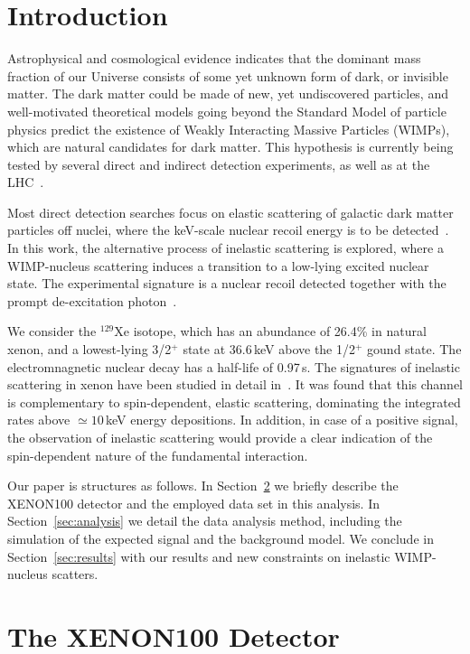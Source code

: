 \section{\label{sec:level1} Introduction}
Astrophysical and cosmological evidence indicates that the dominant mass fraction of our Universe consists of some yet unknown
form of dark, or invisible matter. The dark matter could be made of new, yet undiscovered particles, and well-motivated
theoretical models going beyond the Standard Model of particle physics predict the existence of Weakly Interacting Massive
Particles (WIMPs), which are natural candidates for dark matter. This hypothesis is currently being tested by several direct
and indirect detection experiments, as well as at the LHC~\cite{Bertone:2010zza,Baudis:2016qwx}.

Most direct detection searches focus on elastic scattering of galactic dark matter particles off nuclei, where the keV-scale 
nuclear recoil energy is to be detected~\cite{Baudis:2012ig,Baudis:2015mpa,Undagoitia:2015gya}. In this work, the 
alternative process of inelastic scattering is explored, where a WIMP-nucleus scattering induces a transition to a low-lying 
excited nuclear state. The experimental signature is a nuclear recoil detected together with the prompt de-excitation 
photon~\cite{Ellis:1988nb}. 

We consider the $^{129}\text{Xe}$ isotope, which has an abundance of 26.4\% in natural xenon, and a lowest-lying 
3/2$^{+}$ state at 36.6\,keV above the 1/2$^+$ gound state. The electromnagnetic nuclear decay has a half-life of 0.97\,s. 
The signatures of inelastic scattering in xenon have been studied in detail in~\cite{Baudis:2013bba}. It was found that this 
channel is complementary to spin-dependent, elastic scattering, dominating the integrated rates above $\simeq10$\,keV energy 
depositions. In addition, in case of a positive signal, the observation of inelastic scattering would provide a clear 
indication of the spin-dependent nature of the fundamental interaction. 

Our paper is structures as follows.  In Section~\ref{sec:xenon100} we briefly describe the XENON100 detector and the employed data 
set in this analysis. In Section~\ref{sec:analysis} we detail the data analysis method, including the simulation of the expected signal and the 
background model. We conclude in Section~\ref{sec:results} with our results and new constraints on inelastic WIMP-nucleus scatters.

\section{The XENON100 Detector}
\label{sec:xenon100}

